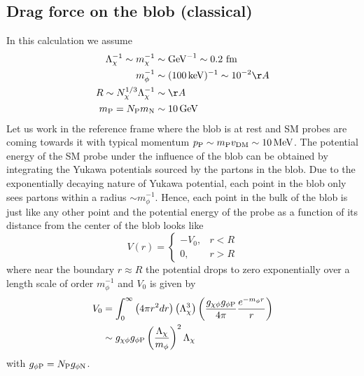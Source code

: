 \documentclass[%
 reprint,
 amsmath,amssymb,
 aps,nofootinbib
]{revtex4-1}
\newcommand{\keV}{\mathinner{\mathrm{keV}}}
\newcommand{\MeV}{\mathinner{\mathrm{MeV}}}
\newcommand{\GeV}{\mathinner{\mathrm{GeV}}}
\begin{document}
\subsection{Drag force on the blob (classical)}
In this calculation we assume 
\begin{align}
    \Lambda_\chi^{-1}\sim m_\chi^{-1}&\sim\GeV^{-1}\sim 0.2 \text{ fm}\nonumber\\
    m_\phi^{-1}&\sim (100\keV)^{-1}\sim 10^{-2}\AA\nonumber\\
    R\sim N_\chi^{1/3}\Lambda_\chi^{-1}&\sim \AA \nonumber\\
    m_{\rm P}=N_{\rm P}m_{\rm N}&\sim 10 \GeV
\end{align}
Let us work in the reference frame where the blob is at rest and SM probes are coming towards it with typical momentum $p_{\rm P}\sim m_{\rm P} v_{\rm DM}\sim 10\MeV$. The potential energy of the SM probe under the influence of the blob can be obtained by integrating the Yukawa potentials sourced by the partons in the blob. Due to the exponentially decaying nature of Yukawa potential, each point in the blob only sees partons within a radius $\sim m_\phi^{-1}$. Hence, each point in the bulk of the blob is just like any other point and the potential energy of the probe as a function of its distance from the center of the blob looks like
\begin{equation}
    V(r)=\begin{cases}
    -V_0, &r<R\\
    0, &r>R
    \end{cases}
\end{equation}
where near the boundary $r\approx R$ the potential drops to zero exponentially over a length scale of order $m_\phi^{-1}$ and $V_0$ is given by
\begin{align}
    V_0&=\int_0^\infty \left(4\pi r^2 dr\right)\left(\Lambda_\chi^3\right)\left(\frac{g_{\chi\phi}g_{\phi \rm P}}{4\pi}\frac{e^{-m_\phi r}}{r}\right)\nonumber\\
    &\sim g_{\chi\phi}g_{\phi \rm P} \left(\frac{\Lambda_\chi}{m_\phi}\right)^2\Lambda_\chi
\end{align}
with $g_{\phi\rm P}=N_{\rm P}g_{\phi\rm N}$.
\end{document}
